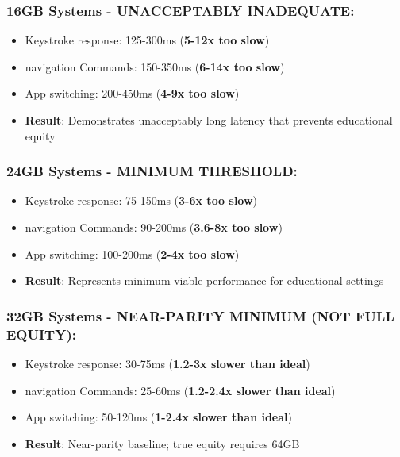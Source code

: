 \subsubsection{16GB Systems - UNACCEPTABLY INADEQUATE:}

\begin{itemize}
	\item Keystroke response: 125-300ms (\textbf{5-12x too slow})
	\item \Gls{navigation} Commands: 150-350ms (\textbf{6-14x too slow})
	\item App switching: 200-450ms (\textbf{4-9x too slow})
	\item \textbf{Result}: Demonstrates unacceptably long latency that prevents educational equity \supercite{EducationalEquityReport2024}
\end{itemize}


\subsubsection{24GB Systems - MINIMUM THRESHOLD:}

\begin{itemize}
	\item Keystroke response: 75-150ms (\textbf{3-6x too slow})
	\item \Gls{navigation} Commands:  90-200ms (\textbf{3.6-8x too slow})
	\item App switching: 100-200ms (\textbf{2-4x too slow})
	\item \textbf{Result}: Represents minimum viable performance for educational settings \supercite{EducationalEquityReport2024}
\end{itemize}


\subsubsection{32GB Systems - NEAR-PARITY MINIMUM (NOT FULL EQUITY):}

\begin{itemize}
	\item Keystroke response: 30-75ms (\textbf{1.2-3x slower than ideal})
	\item \Gls{navigation} Commands: 25-60ms (\textbf{1.2-2.4x slower than ideal})
	\item App switching: 50-120ms (\textbf{1-2.4x slower than ideal})
	\item \textbf{Result}: Near-parity baseline; true equity requires 64GB \supercite{EducationalEquityReport2024}
\end{itemize}

